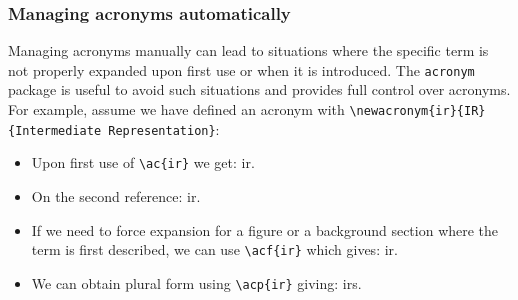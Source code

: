 \documentclass[a4paper]{article}
\newenvironment{draftonly}{}{}
\begin{document}
\begin{draftonly}
\subsubsection{Managing acronyms automatically}
Managing acronyms manually can lead to situations where the specific term is not properly expanded upon first use or when it is introduced.
The \texttt{acronym} package is useful to avoid such situations and provides full control over acronyms.
For example, assume we have defined an acronym with \texttt{\textbackslash{}newacronym\{ir\}\{IR\}\{Intermediate Representation\}}:
\begin{itemize}
  \item Upon first use of \texttt{\textbackslash{}ac\{ir\}} we get: \ac{ir}.
  \item On the second reference: \ac{ir}.
  \item If we need to force expansion for a figure or a background section where the term is first described, we can use \texttt{\textbackslash{}acf\{ir\}} which gives: \acf{ir}.
  \item We can obtain plural form using \texttt{\textbackslash{}acp\{ir\}} giving: \acp{ir}.
\end{itemize}

\end{draftonly}
\end{document}
